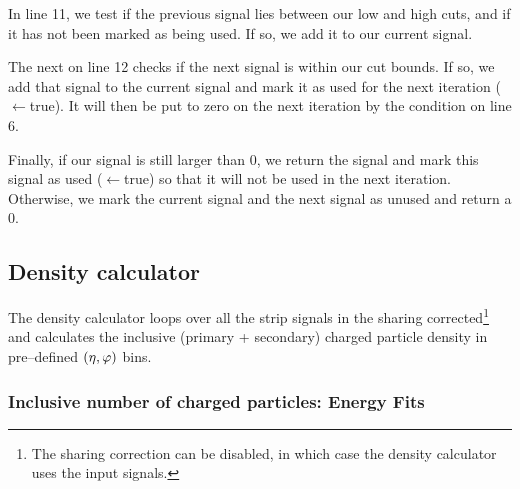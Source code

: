 \documentclass[11pt]{article}
\begin{document}
In line 11, %
we test if the previous signal lies between our low and
high cuts, and if it has not been marked as being used.  If so, we add
it to our current signal.  

The next  on line 12 %
checks if the next signal is within our
cut bounds.  If so, we add that signal to the current signal and mark
it as used for the next iteration ($\leftarrow$true).  It will then be put to zero on the next
iteration by the condition on line 6.

Finally, if our signal is still larger than 0, we return the signal
and mark this signal as used ($\leftarrow$true) so that it will not be used in the next
iteration. Otherwise, we mark the current signal and the next signal
as unused and return a 0. 


\subsection{Density calculator}
\label{sec:sub:density_calculator}

The density calculator loops over all the strip signals in the sharing
corrected\footnote{The sharing correction can be disabled, in which
  case the density calculator uses the input \ESD{} signals.} \ESD{}
and calculates the inclusive (primary + secondary) charged particle
density in pre--defined $(\eta,\varphi)$ bins.

\subsubsection{Inclusive number of charged particles: Energy Fits} 
\label{sec:sub:sub:eloss_fits}
\end{document}
